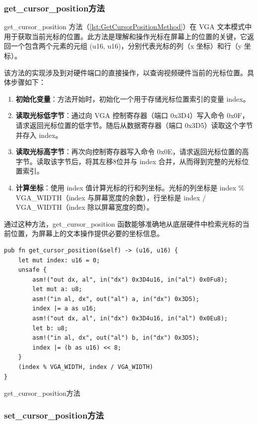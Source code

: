 \subsubsection{get\_cursor\_position方法}

get\_cursor\_position 方法（\cref{lst:GetCursorPositionMethod}）在 VGA 文本模式中用于获取当前光标的位置。此方法是理解和操作光标在屏幕上的位置的关键，它返回一个包含两个元素的元组 (u16, u16)，分别代表光标的列（x 坐标）和行（y 坐标）。

该方法的实现涉及到对硬件端口的直接操作，以查询视频硬件当前的光标位置。具体步骤如下：

\begin{enumerate}
    \item \textbf{初始化变量}：方法开始时，初始化一个用于存储光标位置索引的变量 index。
    \item \textbf{读取光标低字节}：通过向 VGA 控制寄存器（端口 0x3D4）写入命令 0x0F，请求返回光标位置的低字节。随后从数据寄存器（端口 0x3D5）读取这个字节并存入 index。
    \item \textbf{读取光标高字节}：再次向控制寄存器写入命令 0x0E，请求返回光标位置的高字节。读取该字节后，将其左移8位并与 index 合并，从而得到完整的光标位置索引。
    \item \textbf{计算坐标}：使用 index 值计算光标的行和列坐标。光标的列坐标是 index \% VGA\_WIDTH（index 与屏幕宽度的余数），行坐标是 index / VGA\_WIDTH（index 除以屏幕宽度的商）。
\end{enumerate}

通过这种方法，get\_cursor\_position 函数能够准确地从底层硬件中检索光标的当前位置，为屏幕上的文本操作提供必要的坐标信息。

\begin{listing}[htbp]
    \begin{verbatim}
pub fn get_cursor_position(&self) -> (u16, u16) {
    let mut index: u16 = 0;
    unsafe {
        asm!("out dx, al", in("dx") 0x3D4u16, in("al") 0x0Fu8);
        let mut a: u8;
        asm!("in al, dx", out("al") a, in("dx") 0x3D5);
        index |= a as u16;
        asm!("out dx, al", in("dx") 0x3D4u16, in("al") 0x0Eu8);
        let b: u8;
        asm!("in al, dx", out("al") b, in("dx") 0x3D5);
        index |= (b as u16) << 8;
    }
    (index % VGA_WIDTH, index / VGA_WIDTH)
}
    \end{verbatim}
    \caption{get\_cursor\_position方法}\label{lst:GetCursorPositionMethod}
\end{listing}

\subsubsection{set\_cursor\_position方法}

